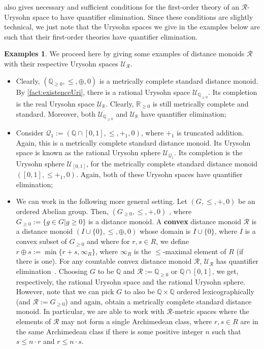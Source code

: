 \documentclass{article}
\theoremstyle{remark}
\theoremstyle{definition}
\newtheorem{examples}[theorem]{Examples}
\newcommand{\U}[0]{\mathbb{U}}
\renewcommand{\U}[0]{\mathcal{U}}
\renewcommand\leq{\leqslant}
\renewcommand\geq{\geqslant}
\newcommand{\rr}[0]{\mathcal{R}}
\begin{document}
{{{{{\cite[Theorem 2.8.11]{con15} also gives necessary and sufficient conditions for the first-order theory of an $\rr$-Urysohn space to have quantifier elimination. Since these conditions are slightly technical, we just note that the Urysohn spaces we give in the examples below are such that their first-order theories have quantifier elimination. 

\begin{examples}\label{examples:uri} We proceed here by giving some examples of distance monoids $\rr$ with their respective Urysohn spaces $\U_\rr$. 
\begin{itemize}
    \item Clearly, {$(\mathbb{Q}_{\geq 0}, \leq, \oplus, 0)$} is a metrically complete standard distance monoid. By \cref{fact:existenceUri}, there is a rational Urysohn space $\U_{\mathbb{Q}_{\geq 0}}$. Its completion is the  real Urysohn space $\U_{\mathbb{R}}$. Clearly, $\mathbb{R}_{\geq 0}$ is still metrically complete and standard. Moreover, both $\U_{\mathbb{Q}_{\geq 0}}$ and $\U_{\mathbb{R}}$ have quantifier elimination;
    \item Consider $\mathcal{Q}_1:=(\mathbb{Q}\cap[0,1], \leq, +_1, 0)$, where $+_1$ is truncated addition. Again, this is a metrically complete standard distance monoid. Its Urysohn space is known as the rational Urysohn sphere $\U_{\mathcal{Q}_1}$. Its completion is the Urysohn sphere $\U_{[0,1]}$, for the metrically complete standard distance monoid $([0,1], \leq +_1, 0)$. Again, both of these Urysohn spaces have quantifier elimination;
\item We can work in the following more general setting. Let $(G, \leq, +, 0)$ be an ordered Abelian group. Then, $(G_{\geq 0}, \leq, +, 0)$ , where $G_{\geq 0}:=\{g\in G\vert g\geq 0\}$ is a distance monoid. A \textbf{convex} distance monoid $\rr$ is a distance monoid $(I\cup\{0\}, \leq, \oplus, 0)$ whose domain is $I\cup\{0\}$, where $I$ is a convex subset of $G_{\geq 0}$ and where for $r,s\in R$, we define $r\oplus s:=\min\{r+s, \infty_R\}$, where $\infty_R$ is the $\leq$-maximal element of $R$ (if there is one). For any countable convex distance monoid $\rr$, $\U_{\rr}$ has quantifier elimination~\cite[Proposition 2.9.4]{con15}. Choosing $G$ to be $\mathbb{Q}$ and $\rr:=\mathbb{Q}_{\geq 0}$ or $\mathbb{Q}\cap[0,1]$, we get, respectively, the rational Urysohn space and the rational Urysohn sphere. However, note that we can pick $G$ to also be $\mathbb{Q}\times \mathbb{Q}$ ordered lexicographically (and $\rr:=G_{\geq 0}$) and again, obtain a metrically complete standard distance monoid. In particular, we are able to work with $\rr$-metric spaces where the elements of $\rr$ may not form a single Archimedean class, where $r,s\in R$ are in the same Archimedean class if there is some positive integer $n$ such that $s\leq n\cdot r$ and $r\leq n\cdot s$.

\end{itemize}
\end{examples}}}}}}
\end{document}
